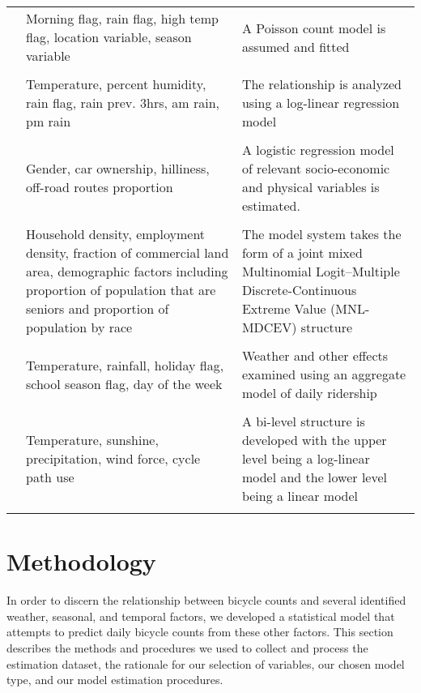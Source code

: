 \documentclass[12pt,letterpaper,article]{memoir}
\begin{document}
\begin{table}[htdp]
\begin{center}
\begin{scriptsize}
\begin{tabularx}{1.0\textwidth}{>{\raggedright\arraybackslash}p{2.7cm}>{\raggedright\arraybackslash}X>{\raggedright\arraybackslash}X}
\\
  \cite{Niemeier:1996aa} & Morning flag, rain flag, high temp flag, location variable, season variable & A Poisson count model is assumed and fitted \\
\\
  \cite{Nosal:2014aa} & Temperature, percent humidity, rain flag, rain prev. 3hrs, am rain, pm rain & The relationship is analyzed using a log-linear regression model \\
\\
  \cite{Parkin:2008aa} & Gender, car ownership, hilliness, off-road routes proportion & A logistic regression model of relevant socio-economic and physical variables is estimated. \\
\\
  \cite{Pinjari:2009aa} & Household density, employment density, fraction of commercial land area, demographic factors including proportion of population that are seniors and proportion of population by race & The model system takes the form of a joint mixed Multinomial Logit–Multiple Discrete-Continuous Extreme Value (MNL-MDCEV) structure \\
\\
  \cite{Rose:2011aa} & Temperature, rainfall, holiday flag, school season flag, day of the week & Weather and other effects examined using an aggregate model of daily ridership \\
\\
  \cite{Thomas:2009aa} & Temperature, sunshine, precipitation, wind force, cycle path use & A bi-level structure is developed with the upper level being a log-linear model and the lower level being a linear model \\
  \bottomrule
\label{tb:lit}
\end{tabularx}
\end{scriptsize}
\end{center}
\end{table}

\FloatBarrier


\chapter*{Methodology}

In order to discern the relationship between bicycle counts and
several identified weather, seasonal, and temporal factors, we
developed a statistical model that attempts to predict daily bicycle
counts from these other factors. This section describes the methods
and procedures we used to collect and process the estimation dataset,
the rationale for our selection of variables, our chosen model type,
and our model estimation procedures.
\end{document}
